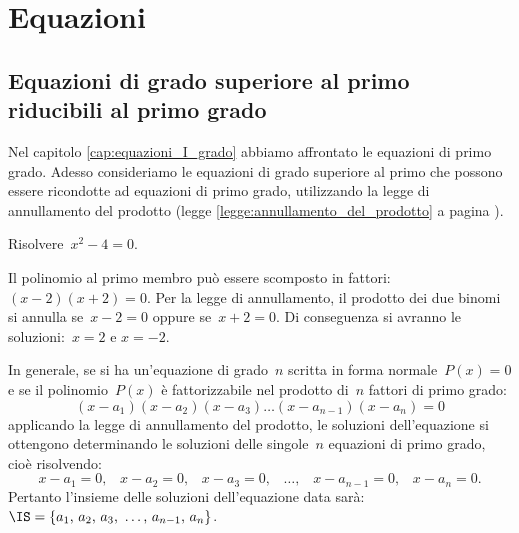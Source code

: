 
\chapter{Equazioni}

\section{Equazioni di grado superiore al primo riducibili al primo grado}

Nel capitolo \ref{cap:equazioni_I_grado} abbiamo affrontato le equazioni di primo grado. Adesso consideriamo le equazioni di grado superiore al primo che possono essere ricondotte ad equazioni di primo grado,
utilizzando la legge di annullamento del prodotto (legge \ref{legge:annullamento_del_prodotto} a pagina \pageref{legge:annullamento_del_prodotto}).

\begin{exrig}
 \begin{esempio}
Risolvere~$x^{2}-4=0$.

Il polinomio al primo membro può essere scomposto in fattori:~$(x-2)(x+2)=0$.
Per la legge di annullamento, il prodotto dei due binomi si annulla se~$x-2=0$ oppure se~$x+2=0$.
Di conseguenza si avranno le soluzioni:~$x=2$ e $x=-2$.
 \end{esempio}
\end{exrig}

In generale, se si ha un’equazione di grado~$n$ scritta in forma normale~$P(x)=0$ e se il polinomio~$P(x)$ è
fattorizzabile nel prodotto di~$n$ fattori di primo grado:
\begin{equation*}
(x-a_{1})(x-a_{2})(x-a_{3})\ldots (x-a_{n-1})(x-a_{n})=0
\end{equation*}
applicando la legge di annullamento del prodotto, le soluzioni dell’equazione si ottengono determinando le soluzioni delle singole~$n$
equazioni di primo grado, cioè risolvendo:
\begin{equation*}
x-a_{1}=0\text{,~~~}x-a_{2}=0\text{,~~~}x-a_{3}=0\text{,~~~}\ldots\text{,~~~}x-a_{n-1}=0\text{,~~~}x-a_{n}=0.
\end{equation*}
Pertanto l’insieme delle soluzioni dell’equazione data sarà:~$\IS=\{a_{1}\text{,~}a_{2}\text{,~}a_{3}\text{,~}\ldots\text{,~}a_{n-1}\text{,~}a_{n}\}$.

